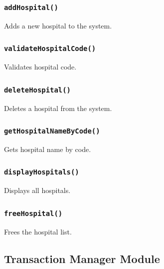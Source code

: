 \documentclass[12pt,a4paper]{report}
\begin{document}
\subsubsection{\texttt{addHospital()}}
Adds a new hospital to the system.


\subsubsection{\texttt{validateHospitalCode()}}
Validates hospital code.


\subsubsection{\texttt{deleteHospital()}}
Deletes a hospital from the system.


\subsubsection{\texttt{getHospitalNameByCode()}}
Gets hospital name by code.


\subsubsection{\texttt{displayHospitals()}}
Displays all hospitals.


\subsubsection{\texttt{freeHospital()}}
Frees the hospital list.


\subsection{Transaction Manager Module}
\end{document}
